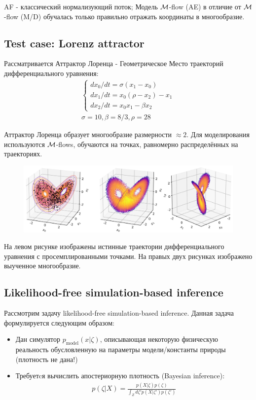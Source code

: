 AF - классический нормализующий поток; Модель $\mathcal{M}$-flow (AE) в отличие от $\mathcal{M}$-flow (M/D) обучалась только правильно отражать координаты в многообразие.

\newpage

\subsection{Test case: Lorenz attractor}

Рассматривается Аттрактор Лоренца - Геометрическое Место траекторий дифференциального уравнения: 
\begin{gather*}
\begin{cases}
dx_0/dt = \sigma(x_1 - x_0) \\
dx_1/dt = x_0(\rho - x_2) - x_1\\
dx_2/dt = x_0 x_1 - \beta x_2
\end{cases}\\
\sigma=10, \beta = 8/3, \rho=28
\end{gather*}

Аттрактор Лоренца образует многообразие размерности $\approx 2$. Для моделирования используются $\mathcal{M}$-flows, обучаются на точках, равномерно распределённых на траекториях.

\begin{figure}[h]
    \centering
    \includegraphics[width=0.7\linewidth]{chapters/petr_mokrov_s1/figs/lorenz_attractor.png}
\end{figure}

На левом рисунке изображены истинные траектории дифференциального уравнения с просемплированными точками. На правых двух рисунках изображено выученное многообразие.

\subsection{Likelihood-free simulation-based inference}

Рассмотрим задачу likelihood-free simulation-based inference. Данная задача формулируется следующим образом: 
\begin{itemize}
    \item Дан симулятор $p_{\text{model}}(x | \zeta)$, описывающая некоторую физическую реальность обусловленную на параметры модели/константы природы (плотность не дана!)
    \item Требуетcя вычислить апостериорную плотность (Bayesian inference):
    \vspace{-2mm}
    \begin{gather*}
        p(\zeta | X) = \frac{p(X | \zeta) p(\zeta)}{\int_{Z} d \zeta' p(X | \zeta') p(\zeta')}
    \end{gather*}
\end{itemize}

